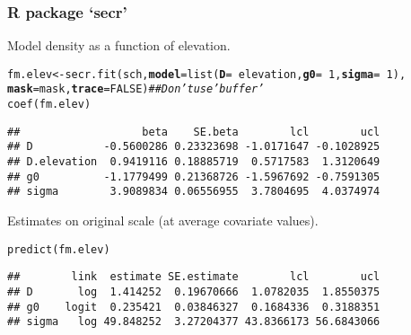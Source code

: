 \documentclass[color=usenames,dvipsnames]{beamer}\usepackage[]{graphicx}\usepackage[]{color}
\makeatletter
\newcommand{\hlnum}[1]{\textcolor[rgb]{0.69,0.494,0}{#1}}%
\newcommand{\hlcom}[1]{\textcolor[rgb]{0.514,0.506,0.514}{\textit{#1}}}%
\newcommand{\hlopt}[1]{\textcolor[rgb]{0,0,0}{#1}}%
\newcommand{\hlstd}[1]{\textcolor[rgb]{0,0,0}{#1}}%
\newcommand{\hlkwb}[1]{\textcolor[rgb]{0,0.341,0.682}{#1}}%
\newcommand{\hlkwc}[1]{\textcolor[rgb]{0,0,0}{\textbf{#1}}}%
\newcommand{\hlkwd}[1]{\textcolor[rgb]{0.004,0.004,0.506}{#1}}%
\newenvironment{kframe}{%
 \def\at@end@of@kframe{}%
 \ifinner\ifhmode%
  \def\at@end@of@kframe{\end{minipage}}%
  \begin{minipage}{\columnwidth}%
 \fi\fi%
 \def\FrameCommand##1{\hskip\@totalleftmargin \hskip-\fboxsep
 \colorbox{shadecolor}{##1}\hskip-\fboxsep
     \hskip-\linewidth \hskip-\@totalleftmargin \hskip\columnwidth}%
 \MakeFramed {\advance\hsize-\width
   \@totalleftmargin\z@ \linewidth\hsize
   \@setminipage}}%
 {\par\unskip\endMakeFramed%
 \at@end@of@kframe}
\newenvironment{knitrout}{}{} %
\makeatother
\begin{document}
\begin{frame}[fragile]
  \frametitle{R package `secr'}
  Model density as a function of elevation. 
\begin{knitrout}\scriptsize
{}\color{fgcolor}\begin{kframe}
\begin{alltt}
\hlstd{fm.elev} \hlkwb{<-} \hlkwd{secr.fit}\hlstd{(sch,} \hlkwc{model}\hlstd{=}\hlkwd{list}\hlstd{(}\hlkwc{D}\hlstd{=}\hlopt{~}\hlstd{elevation,} \hlkwc{g0}\hlstd{=}\hlopt{~}\hlnum{1}\hlstd{,} \hlkwc{sigma}\hlstd{=}\hlopt{~}\hlnum{1}\hlstd{),}
                    \hlkwc{mask}\hlstd{=mask,} \hlkwc{trace}\hlstd{=}\hlnum{FALSE}\hlstd{)}  \hlcom{## Don't use 'buffer'}
\hlkwd{coef}\hlstd{(fm.elev)}
\end{alltt}
\begin{verbatim}
##                   beta    SE.beta        lcl        ucl
## D           -0.5600286 0.23323698 -1.0171647 -0.1028925
## D.elevation  0.9419116 0.18885719  0.5717583  1.3120649
## g0          -1.1779499 0.21368726 -1.5967692 -0.7591305
## sigma        3.9089834 0.06556955  3.7804695  4.0374974
\end{verbatim}
\end{kframe}
\end{knitrout}
\pause
\vfill
Estimates on original scale (at average covariate values).
\begin{knitrout}\scriptsize
{}\color{fgcolor}\begin{kframe}
\begin{alltt}
\hlkwd{predict}\hlstd{(fm.elev)}
\end{alltt}
\begin{verbatim}
##        link  estimate SE.estimate        lcl        ucl
## D       log  1.414252  0.19670666  1.0782035  1.8550375
## g0    logit  0.235421  0.03846327  0.1684336  0.3188351
## sigma   log 49.848252  3.27204377 43.8366173 56.6843066
\end{verbatim}
\end{kframe}
\end{knitrout}
\end{frame}
\end{document}

